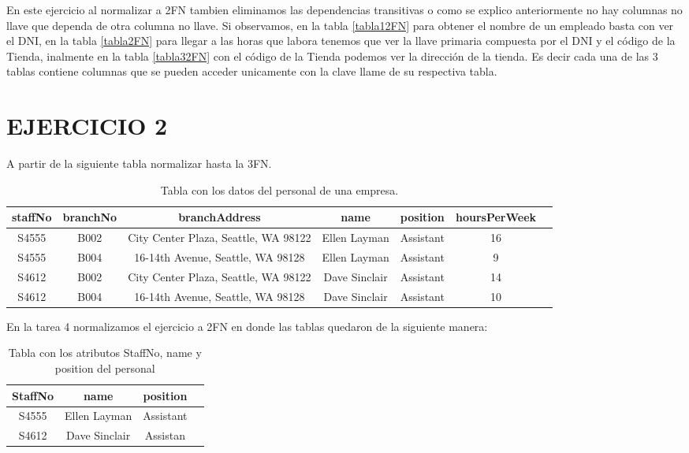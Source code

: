 \documentclass[spanish]{article}
\begin{document}
    En este ejercicio al normalizar a 2FN tambien eliminamos las dependencias transitivas o como se explico anteriormente no hay columnas no llave que dependa de otra columna no llave. Si observamos, en la tabla \ref{tabla12FN} para obtener el nombre de un empleado basta con ver el DNI, en la tabla \ref{tabla2FN} para llegar a las horas que labora tenemos que ver la llave primaria compuesta por el DNI y el código de la Tienda, inalmente en la tabla \ref{tabla32FN} con el código de la Tienda podemos ver la dirección de la tienda. Es decir cada una de las 3 tablas contiene columnas que se pueden acceder unicamente con la clave llame de su respectiva tabla.

\section{EJERCICIO 2}
 A partir de la siguiente tabla normalizar hasta la 3FN.
    
    \begin{table}[ht]
    \centering
	\begin{tabular}{|c|c|c|c|c|c|l|}
	\hline
	\rowcolor{LightBlue2}
	\textbf{staffNo} & \textbf{branchNo} & \textbf{branchAddress} &  \textbf{name} & \textbf{position} & \textbf{hoursPerWeek}\\ \hline
	 S4555 & B002 & City Center Plaza, Seattle, WA 98122 & Ellen Layman & Assistant & 16\\ \hline
	 S4555 & B004 & 16-14th Avenue, Seattle, WA 98128 & Ellen Layman & Assistant & 9\\ \hline
	 S4612 & B002 & City Center Plaza, Seattle, WA 98122 & Dave Sinclair & Assistant & 14\\ \hline
	 S4612 & B004 & 16-14th Avenue, Seattle, WA 98128 & Dave Sinclair & Assistant & 10\\ \hline
	\end{tabular}
	\caption{Tabla con los datos del personal de una empresa.} \label{semi}
	\end{table}
	
	En la tarea 4 normalizamos el ejercicio a 2FN en donde las tablas quedaron de la siguiente manera:\\
	
	\begin{table}[ht]
	    \centering
	    \begin{tabular}{|c|c|c|l|}
	    \hline
	    \rowcolor{green}
	    \textbf{StaffNo} & \textbf{name} & \textbf{position}\\ \hline
	        S4555 &  Ellen Layman & Assistant\\ \hline
	        S4612 &  Dave Sinclair & Assistan\\ \hline
	    \end{tabular} 
	    \caption{Tabla con los atributos StaffNo, name y position del personal}
	    \label{tab:Personal}
	\end{table}
	
\end{document}
